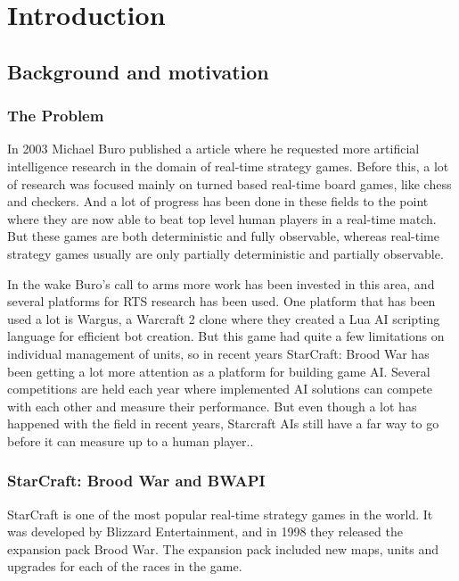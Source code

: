 
\chapter{Introduction}

\section{Background and motivation}

\subsection{The Problem}
In 2003 Michael Buro published a article where he requested more artificial
intelligence research in the domain of real-time strategy
games.\cite{buro2003real} Before this, a lot of research was focused mainly on
turned based real-time board games, like chess and checkers. And a lot of
progress has been done in these fields to the point where they are now able to
beat top level human players in a real-time match. \cite{campbell2002deep} But
these games are both deterministic and fully observable, whereas real-time
strategy games usually are only partially deterministic and partially
observable.

In the wake Buro's call to arms more work has been invested in this area, and
several platforms for RTS research has been used. One platform that has been
used a lot is Wargus\cite{wargus}, a Warcraft 2 clone where they created a Lua
AI scripting language for efficient bot creation. But this game had quite a few
limitations on individual management of units, so in recent years StarCraft:
Brood War has been getting a lot more attention as a platform for building game
AI. Several competitions are held each year where implemented AI solutions can
compete with each other and measure their performance. But even though a lot has
happened with the field in recent years, Starcraft AIs still have a far way to
go before it can measure up to a human player.\cite{eisbotvsfong}.

\subsection{StarCraft: Brood War and BWAPI}
StarCraft is one of the most popular real-time strategy games in the world. It
was developed by Blizzard Entertainment, and in 1998 they released the expansion
pack Brood War. The expansion pack included new maps, units and upgrades for
each of the races in the game.
 
